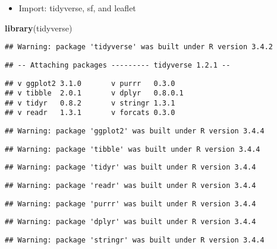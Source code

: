 \documentclass[]{article}
\newenvironment{Shaded}{\begin{snugshade}}{\end{snugshade}}
\newcommand{\KeywordTok}[1]{\textcolor[rgb]{0.13,0.29,0.53}{\textbf{#1}}}
\newcommand{\NormalTok}[1]{#1}
\providecommand{\tightlist}{%
  \setlength{\itemsep}{0pt}\setlength{\parskip}{0pt}}
\begin{document}
\begin{itemize}
\tightlist
\item
  Import: tidyverse, sf, and leaflet
\end{itemize}

\begin{Shaded}
\begin{Highlighting}[]
\KeywordTok{library}\NormalTok{(tidyverse)}
\end{Highlighting}
\end{Shaded}

\begin{verbatim}
## Warning: package 'tidyverse' was built under R version 3.4.2
\end{verbatim}

\begin{verbatim}
## -- Attaching packages --------- tidyverse 1.2.1 --
\end{verbatim}

\begin{verbatim}
## v ggplot2 3.1.0       v purrr   0.3.0  
## v tibble  2.0.1       v dplyr   0.8.0.1
## v tidyr   0.8.2       v stringr 1.3.1  
## v readr   1.3.1       v forcats 0.3.0
\end{verbatim}

\begin{verbatim}
## Warning: package 'ggplot2' was built under R version 3.4.4
\end{verbatim}

\begin{verbatim}
## Warning: package 'tibble' was built under R version 3.4.4
\end{verbatim}

\begin{verbatim}
## Warning: package 'tidyr' was built under R version 3.4.4
\end{verbatim}

\begin{verbatim}
## Warning: package 'readr' was built under R version 3.4.4
\end{verbatim}

\begin{verbatim}
## Warning: package 'purrr' was built under R version 3.4.4
\end{verbatim}

\begin{verbatim}
## Warning: package 'dplyr' was built under R version 3.4.4
\end{verbatim}

\begin{verbatim}
## Warning: package 'stringr' was built under R version 3.4.4
\end{verbatim}
\end{document}
